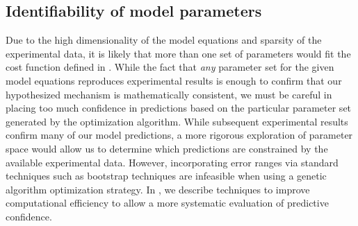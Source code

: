 \subsection{Identifiability of model parameters}
Due to the high dimensionality of the model equations and sparsity of the experimental data, it is likely that more than one set of parameters would fit the cost function defined in . 
While the fact that {\itshape any} parameter set for the given model equations reproduces experimental results is enough to confirm that our hypothesized mechanism is mathematically consistent, we must be careful in placing too much confidence in predictions based on the particular parameter set generated by the optimization algorithm. 
While subsequent experimental results confirm many of our model predictions, a more rigorous exploration of parameter space would allow us to determine which predictions are constrained by the available experimental data. 
However, incorporating error ranges via standard techniques such as bootstrap techniques are infeasible when using a genetic algorithm optimization strategy. 
In , we describe techniques to improve computational efficiency to allow a more systematic evaluation of predictive confidence.
